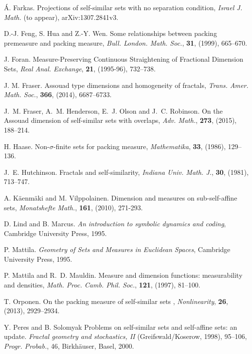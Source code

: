 \documentclass[11pt,english,british]{article}
\numberwithin{equation}{section}
\begin{document}
\begin{thebibliography}{99}
\'A. Farkas.
 Projections of self-similar sets with no separation condition, \emph{Israel J. Math.} (to appear), arXiv:1307.2841v3.


D.-J. Feng, S. Hua and Z.-Y. Wen.
Some relationships between packing premeasure and packing measure, {\em Bull. London. Math. Soc.}, {\bf 31}, (1999), 665--670.

J. Foran.
Measure-Preserving Continuous Straightening of Fractional Dimension Sets,
{\em  Real Anal. Exchange}, {\bf 21}, (1995-96), 732--738.

 J. M. Fraser.  Assouad type dimensions and homogeneity of fractals, \emph{Trans. Amer. Math. Soc.}, {\bf 366}, (2014), 6687--6733.

J.~M. {Fraser}, A.~M. {Henderson}, E.~J. {Olson} and J.~C. {Robinson}.
 On the Assouad dimension of self-similar sets with overlaps,  {\em Adv. Math.}, {\bf 273}, (2015), 188--214.

H. Haase.
Non-$\sigma$-finite sets for packing measure,
{\em Mathematika}, {\bf 33}, (1986), 129--136.


J.~E. Hutchinson.
 Fractals and self-similarity,
{\em Indiana Univ. Math. J.}, {\bf 30}, (1981), 713--747.

A. K\"aenm\"aki and M. Vilppolainen.
Dimension and measures on sub-self-affine sets,
{\em Monatshefte Math.}, {\bf 161}, (2010),  271-293.

D. Lind and B. Marcus.
{\em An introduction to symbolic dynamics and coding},
Cambridge University Press, 1995.



P. Mattila.
{\em Geometry of Sets and Measures in Euclidean Spaces},
Cambridge University Press, 1995.

P. Mattila and R.~D. Mauldin.
Measure and dimension functions: measurability and densities,
{\em Math. Proc. Camb. Phil. Soc.}, {\bf 121}, (1997), 81--100.


T. Orponen.
On the packing measure of self-similar sets ,
\emph{Nonlinearity}, {\bf 26},  (2013), 2929--2934. 



Y. Peres and B. Solomyak
Problems on self-similar sets and self-affine sets: an update. \emph{Fractal geometry and stochastics, II} (Greifswald/Koserow, 1998), 95--106,
\emph{Progr. Probab.}, 46, Birkh\"auser, Basel, 2000. 



\end{thebibliography}
\end{document}
